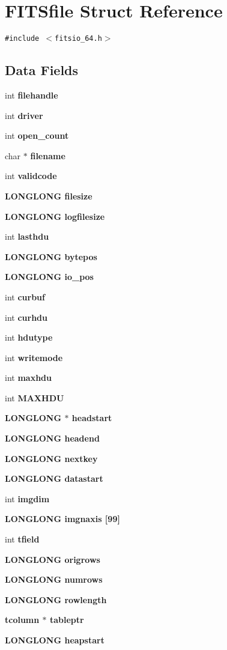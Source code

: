 \section{FITSfile Struct Reference}
\label{structFITSfile}
{\tt \#include $<$fitsio\_\-64.h$>$}

\subsection*{Data Fields}
\begin{CompactItemize}
\item 
int \bf{filehandle}
\item 
int \bf{driver}
\item 
int \bf{open\_\-count}
\item 
char $\ast$ \bf{filename}
\item 
int \bf{validcode}
\item 
\bf{LONGLONG} \bf{filesize}
\item 
\bf{LONGLONG} \bf{logfilesize}
\item 
int \bf{lasthdu}
\item 
\bf{LONGLONG} \bf{bytepos}
\item 
\bf{LONGLONG} \bf{io\_\-pos}
\item 
int \bf{curbuf}
\item 
int \bf{curhdu}
\item 
int \bf{hdutype}
\item 
int \bf{writemode}
\item 
int \bf{maxhdu}
\item 
int \bf{MAXHDU}
\item 
\bf{LONGLONG} $\ast$ \bf{headstart}
\item 
\bf{LONGLONG} \bf{headend}
\item 
\bf{LONGLONG} \bf{nextkey}
\item 
\bf{LONGLONG} \bf{datastart}
\item 
int \bf{imgdim}
\item 
\bf{LONGLONG} \bf{imgnaxis} [99]
\item 
int \bf{tfield}
\item 
\bf{LONGLONG} \bf{origrows}
\item 
\bf{LONGLONG} \bf{numrows}
\item 
\bf{LONGLONG} \bf{rowlength}
\item 
\bf{tcolumn} $\ast$ \bf{tableptr}
\item 
\bf{LONGLONG} \bf{heapstart}
\item 

\end{CompactItemize}
